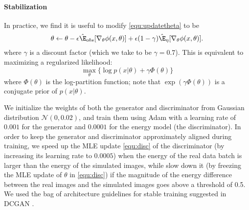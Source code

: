 \paragraph{Stabilization}
In practice, we find it is useful to modify \eqref{equ:updatetheta} to be 
\begin{align}\label{equ:disc}
\theta \gets \theta - \epsilon \hat\E_{obs}[ \nabla_\theta \phi (x,\theta) ] + 
\epsilon (1-\gamma) \hat\E_{\eta} [\nabla_\theta \phi(x, \theta)]. 
\end{align}
where $\gamma$ is a discount factor (which we take to be $\gamma = 0.7$). 
This is equivalent to maximizing a regularized likelihood: 
$$
\max_\theta  \{ \log   p(x |\theta)  +  \gamma \Phi(\theta)\}
$$
where $\Phi(\theta)$ is the log-partition function; note that $\exp( \gamma \Phi(\theta))$ is a conjugate prior of $p(x|\theta)$. 

We initialize the weights of both the generator and discriminator from Gaussian distribution $\mathcal{N}(0,0.02)$, 
and train them using Adam \citep{kingma2014adam} with a learning rate of $0.001$ for the generator and $0.0001$ for the energy model (the discriminator).  
In order to keep the generator and discriminator approximately aligned during training, 
we speed up the MLE update \eqref{equ:disc} of the discriminator (by increasing its learning rate to $0.0005$) when the energy of the real data batch is larger than the energy of the simulated images, 
while slow down it (by freezing the MLE update of $\theta$ in \eqref{equ:disc}) if the magnitude of the energy difference between the real images and the simulated images goes above a threshold of 0.5.
We used the bag of architecture guidelines for stable training suggested in DCGAN \citep{radford2015unsupervised}.

